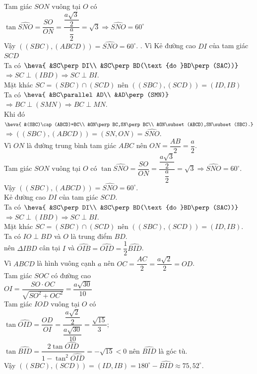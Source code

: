 \begin{ex}
{\begin{itemchoice}
			Tam giác $SON$ vuông tại $O$ có\\ $\tan\widehat{SNO}=\dfrac{SO}{ON}=\dfrac{\dfrac{a\sqrt 3}{2}}{\dfrac{a}{2}}=\sqrt 3\Rightarrow\widehat{SNO}=60^{\circ}$\\
			Vậy $((SBC),(ABCD))=\widehat{SNO}=60^{\circ}$.
			. Vì
			Kẻ đường cao $DI$ của tam giác $SCD$\\
			Ta có $\heva{
				&SC\perp DI\\
				&SC\perp BD(\text{do }BD\perp (SAC))}$
			$\Rightarrow SC\perp (IBD)\Rightarrow SC\perp BI$.\\
			Mặt khác $SC=(SBC)\cap (SCD)$ nên $((SBC),(SCD))=(ID,IB)$\\
			Ta có $\heva{
				&BC\parallel AD\\
				&AD\perp (SMN)}$
			$\Rightarrow BC\perp (SMN)\Rightarrow BC\perp MN$.\\
			Khi đó $\heva{
				&(SBC)\cap (ABCD)=BC\\
				&ON\perp BC,SN\perp BC\\
				&ON\subset (ABCD),SN\subset (SBC).}$\\
			$\Rightarrow((SBC),(ABCD))=(SN,ON)=\widehat{SNO}$.\\
			Vì $ON$ là đường trung bình tam giác $ABC$ nên $ON=\dfrac{AB}{2}=\dfrac{a}{2}$.\\
			Tam giác $SON$ vuông tại $O$ có $\tan\widehat{SNO}=\dfrac{SO}{ON}=\dfrac{\dfrac{a\sqrt 3}{2}}{\dfrac{a}{2}}=\sqrt 3 \Rightarrow\widehat{SNO}=60^{\circ}$.\\
			Vậy $((SBC),(ABCD))=\widehat{SNO}=60^{\circ}$.\\
			Kẻ đường cao $DI$ của tam giác $SCD$.\\
			Ta có $\heva{
				&SC\perp DI\\
				&SC\perp BD(\text{do }BD\perp (SAC))}$
			$\Rightarrow SC\perp (IBD)\Rightarrow SC\perp BI$.\\
			Mặt khác $SC=(SBC)\cap (SCD)$ nên $((SBC),(SCD))=(ID,IB)$.\\
			Ta có $IO\perp BD$ và $O$ là trung điểm $BD$.\\
			nên $\Delta IBD$ cân tại $I$ và $\widehat{OIB}=\widehat{OID}=\dfrac{1}{2}\widehat{BID}$.\\
			Vì $ABCD$ là hình vuông cạnh $a$ nên $OC=\dfrac{AC}{2}=\dfrac{a\sqrt 2}{2}=OD$.\\
			Tam giác $SOC$ có đường cao\\
			$OI=\dfrac{SO\cdot OC}{\sqrt{S{O^2}+O{C^2}}}=\dfrac{a\sqrt{30}}{10}$\\
			Tam giác $IOD$ vuông tại $O$ có\\
			$\tan\widehat{OID}=\dfrac{OD}{OI}=\dfrac{\dfrac{a\sqrt 2}{2}}{\dfrac{a\sqrt{30}}{10}}=\dfrac{\sqrt{15}}{3}$;\\ $\tan\widehat{BID}=\dfrac{2\tan\widehat{OID}}{1-\tan^2\widehat{OID}}=-\sqrt{15}< 0$ nên $\widehat{BID}$ là góc tù.\\
			Vậy $((SBC),(SCD))=(ID,IB)=180^{\circ}-\widehat{BID}\approx75,52^{\circ}$.
		\end{itemchoice}	
	}
\end{ex}
